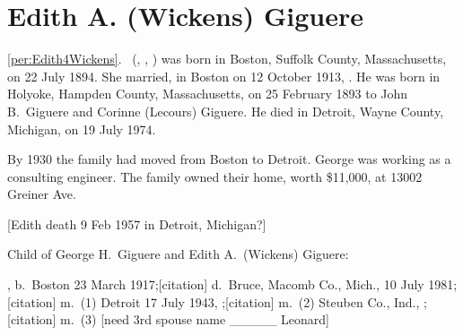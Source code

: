 \section{Edith A. (Wickens) Giguere}

\ref{per:Edith4Wickens}.\  (, , ) was born in Boston, Suffolk County, Massachusetts, on 22 July 1894.\cite{Edith4WickensBirth} She married, in Boston on 12 October 1913, .\cite{Edith4WickensMarriage} He was born in Holyoke, Hampden County, Massachusetts, on 25 February 1893 to John B.\ Giguere and Corinne (Lecours) Giguere.\cite{GeorgeGiguereBirth} He died in Detroit, Wayne County, Michigan, on 19 July 1974.\cite{GeorgeGiguereDeath}

By 1930 the family had moved from Boston to Detroit. George was working as a consulting engineer. The family owned their home, worth \$11,000, at 13002 Greiner Ave.\cite{Census1930GeorgeGiguere}

[Edith death 9 Feb 1957 in Detroit, Michigan?]

\begin{KidsIntro}
	Child of George H.\ Giguere and Edith A.\ (Wickens) Giguere:
\end{KidsIntro}

\begin{Kids}
	, b.\ Boston 23 March 1917;\cite{Doris5GiguereBirth}[citation] d.\ Bruce, Macomb Co., Mich., 10 July 1981;\cite{Doris5GiguereDeath}[citation] m.\ (1) Detroit 17 July 1943, ;\cite{RobertMayMarriage}[citation] m.\ (2) Steuben Co., Ind., ;\cite{JohnMeyersMarriage}[citation] m.\ (3) [need 3rd spouse name \_\_\_\_\_ Leonard]
\end{Kids}